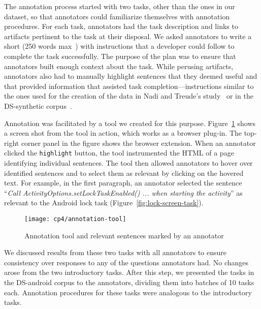 The annotation process started with two tasks, other than the ones in our dataset, so that annotators could familiarize themselves with annotation procedures.
For each task, annotators had the task description and links to artifacts pertinent to the task at their disposal. We asked annotators to write a short (250 words max~\cite{Rastkar2010}) with instructions that a developer could follow to complete the task successfully. 
The purpose of the plan was to ensure that annotators built enough context about the task.
While perusing artifacts, annotators also had to manually highlight sentences that they deemed useful and that provided information that assisted task completion---instructions similar to the ones used for the creation of the data in Nadi and Treude's study~\cite{nadi2020}
or in the \acs{DS-synthetic} corpus~\cite{marques2020}.


Annotation was facilitated by a tool we created for this purpose. 
Figure~\ref{fig:corpus-annotation-tool} shows a screen shot from the tool in 
action, which works as a browser plug-in. The top-right corner panel in the figure shows the browser extension. When an annotator clicked the \texttt{highlight} button, 
the tool instrumented the HTML of a page identifying individual sentences. The tool then allowed annotators to hover over identified sentences and to select them as relevant by clicking on the hovered text. For example, in the first paragraph, an annotator selected  the sentence
``\textit{Call ActivityOptions.setLockTaskEnabled() ... when starting the activity}'' as relevant to the Android lock task (Figure~\ref{fig:lock-screen-task}).







\begin{figure}
    \centering
    \texttt{[image: cp4/annotation-tool]}
    \caption{Annotation tool and relevant sentences marked by an annotator}
    \label{fig:corpus-annotation-tool}
\end{figure}




We discussed results from these two tasks with all annotators to ensure consistency over responses to any of the questions annotators had. No changes arose from the two introductory tasks.
After this step, we presented the  tasks in the \acs{DS-android} corpus to the annotators, dividing them into batches of 10 tasks each. 
Annotation procedures for these tasks were analogous to the introductory tasks.











